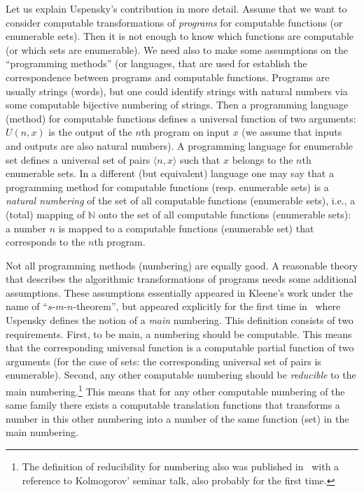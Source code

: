 \documentclass[12pt]{article}
\theoremstyle{remark}
\begin{document}
Let us explain Uspensky's contribution in more detail. Assume that we want to consider computable transformations of \emph{programs} for computable functions (or enumerable sets). Then it is not enough to know which functions are computable (or which sets are enumerable). We need also to make some assumptions on the ``programming methods'' (or languages,  that are used for establish the correspondence between programs and computable functions. Programs are usually strings (words), but one could identify strings with natural numbers via some computable bijective numbering of strings. Then a programming language (method) for computable functions defines a universal function of two arguments: $U(n,x)$ is the output of the $n$th program on input $x$ (we assume that inputs and outputs are also natural numbers). A programming language for enumerable set defines a universal set of pairs $\langle n,x\rangle$ such that $x$ belongs to the $n$th enumerable sets. In a different (but equivalent) language one may say that a programming method for computable functions (resp. enumerable sets) is a \emph{natural numbering} of the set of all computable functions (enumerable sets), i.e., a (total) mapping of $\mathbb{N}$ onto the set of all computable functions (enumerable sets): a number $n$ is mapped to a computable functions (enumerable set) that corresponds to the $n$th program.

Not all programming methods (numbering) are equally good. A reasonable theory that describes the algorithmic transformations of programs needs some additional assumptions. These assumptions essentially appeared in Kleene's work under the name of ``$s$-$m$-$n$-theorem'', but appeared explicitly for the first time in~\cite{1955a} where Uspensky defines the notion of a \emph{main} numbering. This definition consists of two requirements. First, to be main, a numbering should be computable. This means that the corresponding universal function is a computable partial function of two arguments (for the case of sets: the corresponding universal set of pairs is enumerable). Second, any other computable numbering should be \emph{reducible} to the main numbering.\footnote{The definition of reducibility for numbering also was published in~\cite{1955} with a reference to Kolmogorov' seminar talk, also probably for the first time.} This means that for any other computable numbering of the same family there exists a computable translation functions that transforms a number in this other numbering into a number of the same function (set) in the main numbering.
\end{document}
